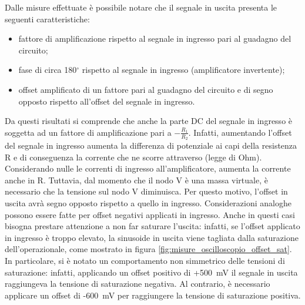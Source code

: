 \noindent
Dalle misure effettuate è possibile notare che il segnale in uscita presenta le seguenti caratteristiche:
\begin{itemize}
	\item fattore di amplificazione rispetto al segnale in ingresso pari al guadagno del circuito;
	\item fase di circa 180$^\circ$ rispetto al segnale in ingresso (amplificatore invertente);
	\item offset amplificato di un fattore pari al guadagno del circuito e di segno opposto rispetto all'offset del segnale in ingresso.
\end{itemize}
Da questi risultati si comprende che anche la parte DC del segnale in ingresso è soggetta ad un fattore di amplificazione pari a $-\frac{R_1}{R_2}$. Infatti, aumentando l'offset del segnale in ingresso aumenta la differenza di potenziale ai capi della resistenza R e di conseguenza la corrente che ne scorre attraverso (legge di Ohm). Considerando nulle le correnti di ingresso all'amplificatore, aumenta la corrente anche in R. Tuttavia, dal momento che il nodo V\super{-} è una massa virtuale, è necessario che la tensione sul nodo V diminuisca. Per questo motivo, l'offset in uscita avrà segno opposto rispetto a quello in ingresso. Considerazioni analoghe possono essere fatte per offset negativi applicati in ingresso.
Anche in questi casi bisogna prestare attenzione a non far saturare l'uscita: infatti, se l'offset applicato in ingresso è troppo elevato, la sinusoide in uscita viene tagliata dalla saturazione dell'operazionale, come mostrato in figura \ref{fig:misure_oscilloscopio_offset_sat}. In particolare, si è notato un comportamento non simmetrico delle tensioni di saturazione: infatti, applicando un offset positivo di +\SI{500}{\milli\volt} il segnale in uscita raggiungeva la tensione di saturazione negativa. Al contrario, è necessario applicare un offset di -\SI{600}{\milli\volt} per raggiungere la tensione di saturazione positiva.

